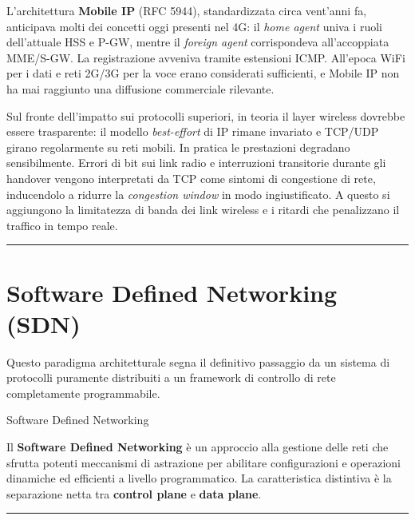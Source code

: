 \documentclass[
  italian,
  openany]{book}
\begin{document}
L'architettura \textbf{Mobile IP} (RFC 5944), standardizzata circa
vent'anni fa, anticipava molti dei concetti oggi presenti nel 4G: il
\emph{home agent} univa i ruoli dell'attuale HSS e P-GW, mentre il
\emph{foreign agent} corrispondeva all'accoppiata MME/S-GW. La
registrazione avveniva tramite estensioni ICMP. All'epoca WiFi per i
dati e reti 2G/3G per la voce erano considerati sufficienti, e Mobile IP
non ha mai raggiunto una diffusione commerciale rilevante.

Sul fronte dell'impatto sui protocolli superiori, in teoria il layer
wireless dovrebbe essere trasparente: il modello \emph{best-effort} di
IP rimane invariato e TCP/UDP girano regolarmente su reti mobili. In
pratica le prestazioni degradano sensibilmente. Errori di bit sui link
radio e interruzioni transitorie durante gli handover vengono
interpretati da TCP come sintomi di congestione di rete, inducendolo a
ridurre la \emph{congestion window} in modo ingiustificato. A questo si
aggiungono la limitatezza di banda dei link wireless e i ritardi che
penalizzano il traffico in tempo reale.

\begin{center}\rule{0.5\linewidth}{0.5pt}\end{center}

\newpage

\chapter{Software Defined Networking
(SDN)}\label{software-defined-networking-sdn}

Questo paradigma architetturale segna il definitivo passaggio da un
sistema di protocolli puramente distribuiti a un framework di controllo
di rete completamente programmabile.

\begin{calloutdefinition}{Software Defined Networking}

Il \textbf{Software Defined Networking} è un approccio alla gestione
delle reti che sfrutta potenti meccanismi di astrazione per abilitare
configurazioni e operazioni dinamiche ed efficienti a livello
programmatico. La caratteristica distintiva è la separazione netta tra
\textbf{control plane} e \textbf{data plane}.

\end{calloutdefinition}

\begin{center}\rule{0.5\linewidth}{0.5pt}\end{center}
\end{document}
